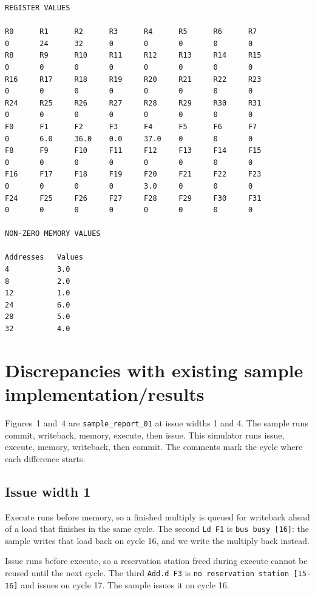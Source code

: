 \documentclass[11pt]{article}
\begin{document}
\begin{Verbatim}[fontsize=\scriptsize]
REGISTER VALUES

R0      R1      R2      R3      R4      R5      R6      R7      
0       24      32      0       0       0       0       0       
R8      R9      R10     R11     R12     R13     R14     R15     
0       0       0       0       0       0       0       0       
R16     R17     R18     R19     R20     R21     R22     R23     
0       0       0       0       0       0       0       0       
R24     R25     R26     R27     R28     R29     R30     R31     
0       0       0       0       0       0       0       0       
F0      F1      F2      F3      F4      F5      F6      F7      
0       6.0     36.0    0.0     37.0    0       0       0       
F8      F9      F10     F11     F12     F13     F14     F15     
0       0       0       0       0       0       0       0       
F16     F17     F18     F19     F20     F21     F22     F23     
0       0       0       0       3.0     0       0       0       
F24     F25     F26     F27     F28     F29     F30     F31     
0       0       0       0       0       0       0       0       

NON-ZERO MEMORY VALUES

Addresses   Values
4           3.0
8           2.0
12          1.0
24          6.0
28          5.0
32          4.0
\end{Verbatim}
\clearpage
\section{Discrepancies with existing sample implementation/results}

Figures~1 and~4 are \texttt{sample\_report\_01} at issue widths 1 and 4. The sample runs commit, writeback, memory, execute, then issue. This simulator runs issue, execute, memory, writeback, then commit. The comments mark the cycle where each difference starts.

\subsection*{Issue width 1}

Execute runs before memory, so a finished multiply is queued for writeback ahead of a load that finishes in the same cycle. The second \texttt{Ld F1} is \texttt{bus busy [16]}: the sample writes that load back on cycle 16, and we write the multiply back instead.

Issue runs before execute, so a reservation station freed during execute cannot be reused until the next cycle. The third \texttt{Add.d F3} is \texttt{no reservation station [15-16]} and issues on cycle 17. The sample issues it on cycle 16.
\end{document}
